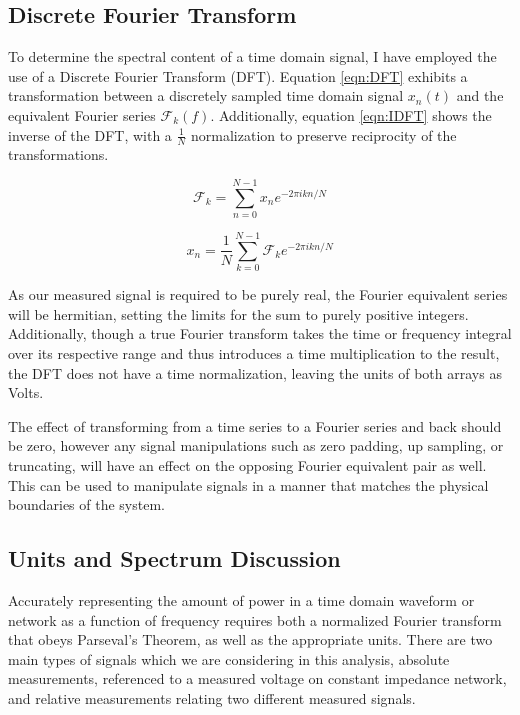 \subsection{Discrete Fourier Transform}

	To determine the spectral content of a time domain signal, I have employed the use of a Discrete Fourier Transform (DFT).  Equation \ref{eqn:DFT} exhibits a transformation between a discretely sampled time domain signal $x_{n}(t)$ and the equivalent Fourier series $\mathcal{F}_{k}(f)$.  Additionally, equation \ref{eqn:IDFT} shows the inverse of the DFT, with a $\frac{1}{N}$ normalization to preserve reciprocity of the transformations.

\begin{equation}
\mathcal{F}_{k} = \sum_{n=0}^{N-1} x_{n}e^{-2\pi ikn/N}
\label{eqn:DFT}
\end{equation}

\begin{equation}
x_{n} = \frac{1}{N}\sum_{k=0}^{N-1} \mathcal{F}_{k}e^{-2\pi ikn/N}
\label{eqn:IDFT}
\end{equation}

As our measured signal is required to be purely real, the Fourier equivalent series will be hermitian, setting the limits for the sum to purely positive integers.  Additionally, though a true Fourier transform takes the time or frequency integral over its respective range and thus introduces a time multiplication to the result, the DFT does not have a time normalization, leaving the units of both arrays as Volts.

The effect of transforming from a time series to a Fourier series and back should be zero, however any signal manipulations such as zero padding, up sampling, or truncating, will have an effect on the opposing Fourier equivalent pair as well.  This can be used to manipulate signals in a manner that matches the physical boundaries of the system.


\subsection{Units and Spectrum Discussion}

	Accurately representing the amount of power in a time domain waveform or network as a function of frequency requires both a normalized Fourier transform that obeys Parseval's Theorem, as well as the appropriate units.  There are two main types of signals which we are considering in this analysis, absolute measurements, referenced to a measured voltage on constant impedance network, and relative measurements relating two different measured signals.  
	

